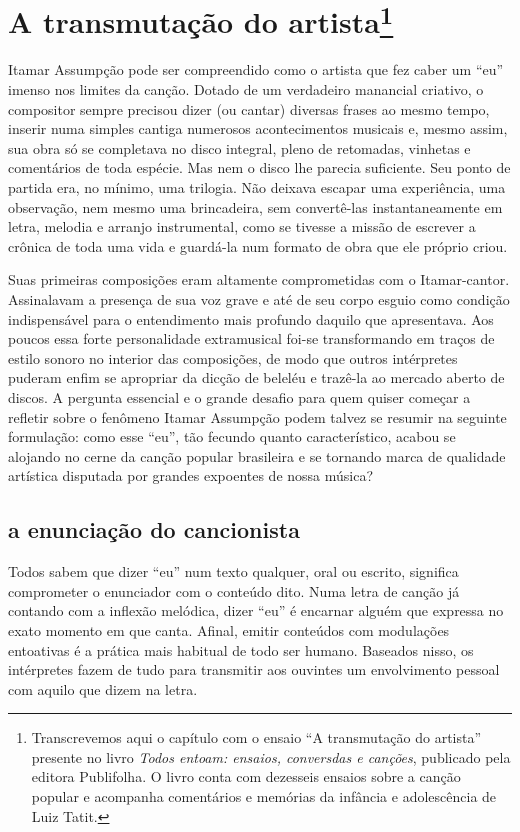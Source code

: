 
\chapter{A transmutação do artista\footnote{Transcrevemos aqui o capítulo com o ensaio ``A transmutação do
artista'' presente no livro \textit{Todos entoam: ensaios, conversdas e canções}, publicado pela editora Publifolha.
O livro conta com dezesseis ensaios sobre a canção popular e acompanha comentários e memórias da infância e adolescência de Luiz Tatit.}}


Itamar Assumpção pode ser compreendido como o artista que fez caber um
``eu'' imenso nos limites da canção. Dotado de um verdadeiro manancial
criativo, o compositor sempre precisou dizer (ou cantar) diversas frases
ao mesmo tempo, inserir numa simples cantiga numerosos acontecimentos
musicais e, mesmo assim, sua obra só se completava no disco integral,
pleno de retomadas, vinhetas e comentários de toda espécie. Mas nem o
disco lhe parecia suficiente. Seu ponto de partida era, no mínimo, uma
trilogia. Não deixava escapar uma experiência, uma observação, nem mesmo
uma brincadeira, sem convertê-las instantaneamente em letra, melodia e
arranjo instrumental, como se tivesse a missão de escrever a crônica de
toda uma vida e guardá-la num formato de obra que ele próprio criou.

Suas primeiras composições eram altamente comprometidas com o
Itamar-cantor. Assinalavam a presença de sua voz grave e até de seu
corpo esguio como condição indispensável para o entendimento mais
profundo daquilo que apresentava. Aos poucos essa forte personalidade
extramusical foi-se transformando em traços de estilo sonoro no interior
das composições, de modo que outros intérpretes puderam enfim se
apropriar da dicção de beleléu e trazê-la ao mercado aberto de discos. A
pergunta essencial e o grande desafio para quem quiser começar a
refletir sobre o fenômeno Itamar Assumpção podem talvez se resumir na
seguinte formulação: como esse ``eu'', tão fecundo quanto
característico, acabou se alojando no cerne da canção popular brasileira
e se tornando marca de qualidade artística disputada por grandes
expoentes de nossa música?

\section{a enunciação do cancionista}

Todos sabem que dizer ``eu'' num texto qualquer, oral ou escrito,
significa comprometer o enunciador com o conteúdo dito. Numa letra de
canção já contando com a inflexão melódica, dizer ``eu'' é encarnar
alguém que expressa no exato momento em que canta. Afinal, emitir
conteúdos com modulações entoativas é a prática mais habitual de todo
ser humano. Baseados nisso, os intérpretes fazem de tudo para transmitir
aos ouvintes um envolvimento pessoal com aquilo que dizem na letra.

